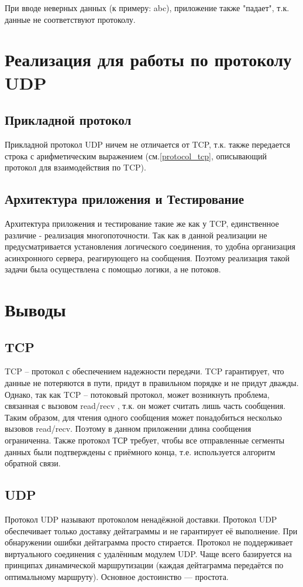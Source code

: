 \documentclass[12pt,a4paper]{report}
\begin{document}
При вводе неверных данных (к примеру: abc), приложение также "падает", т.к. данные не соответствуют протоколу.
\chapter{Реализация для работы по протоколу UDP}

\section{Прикладной протокол}
Прикладной протокол UDP ничем не отличается от TCP, т.к. также передается строка с арифметическим выражением (см.\ref{protocol_tcp}, описывающий протокол для взаимодействия по TCP). 

\section{Архитектура приложения и Тестирование}
Архитектура приложения и тестирование такие же как у TCP, единственное различие - реализация многопоточности. Так как в данной реализации не предусматривается установления логического соединения, то удобна организация асинхронного сервера, реагирующего на сообщения.
Поэтому реализация такой задачи была осуществлена с помощью логики, а не потоков.

\chapter{Выводы}
\section{TCP}
TCP – протокол с обеспечением надежности передачи. TCP гарантирует, что данные не потеряются в пути, придут в правильном порядке и не придут дважды. Однако, так как TCP – потоковый протокол, может возникнуть проблема, связанная с вызовом read/recv , т.к. он может считать лишь часть сообщения. Таким образом, для чтения одного сообщения может понадобиться несколько вызовов read/recv. Поэтому в данном приложении длина сообщения ограниченна. Также протокол ТСР требует, чтобы все отправленные сегменты данных были подтверждены с приёмного конца, т.е. используется алгоритм обратной связи. 
\section{UDP}
    Протокол UDP называют протоколом ненадёжной доставки. Протокол UDP обеспечивает только доставку дейтаграммы и не гарантирует её выполнение. При обнаружении ошибки дейтаграмма просто стирается. Протокол не поддерживает виртуального соединения с удалённым модулем UDP. Чаще всего базируется на принципах динамической маршрутизации (каждая дейтаграмма передаётся по оптимальному маршруту). Основное достоинство — простота.
\end{document}
